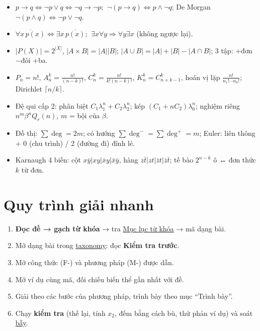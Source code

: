 \documentclass[
  10pt,
  twoside,openany]{book}
\providecommand{\tightlist}{%
  \setlength{\itemsep}{0pt}\setlength{\parskip}{0pt}}
\begin{document}
\begin{itemize}
\tightlist
\item
  \(p\to q\Leftrightarrow\neg p\vee q\Leftrightarrow\neg q\to\neg p\);
  \(\ \neg(p\to q)\Leftrightarrow p\wedge\neg q\); De Morgan
  \(\neg(p\wedge q)\Leftrightarrow\neg p\vee\neg q\).
\item
  \(\overline{\forall x\,p(x)}\Leftrightarrow\exists x\,\overline{p(x)}\);
  \(\ \exists x\forall y\Rightarrow\forall y\exists x\) (không ngược
  lại).
\item
  \(|P(X)|=2^{|X|}\), \(|A\times B|=|A||B|\);
  \(|A\cup B|=|A|+|B|-|A\cap B|\); 3 tập: \(+\)đơn \(-\)đôi \(+\)ba.
\item
  \(P_n=n!\), \(A_n^k=\frac{n!}{(n-k)!}\),
  \(C_n^k=\frac{n!}{k!(n-k)!}\), \(K_n^k=C_{n+k-1}^k\), hoán vị lặp
  \(\frac{n!}{n_1!\cdots n_k!}\); Dirichlet \(\lceil n/k\rceil\).
\item
  Đệ qui cấp 2: phân biệt \(C_1\lambda_1^n+C_2\lambda_2^n\); kép
  \((C_1+nC_2)\lambda_0^n\); nghiệm riêng \(n^m\beta^nQ_r(n)\), \(m\) =
  bội của \(\beta\).
\item
  Đồ thị: \(\sum\deg=2m\); có hướng \(\sum\deg^-=\sum\deg^+=m\); Euler:
  liên thông + 0 (chu trình) / 2 (đường đi) đỉnh lẻ.
\item
  Karnaugh 4 biến: cột \(x\bar y|xy|\bar xy|\bar x\bar y\), hàng
  \(z\bar t|zt|\bar zt|\bar z\bar t\); tế bào \(2^{n-k}\) ô ↔ đơn thức
  \(k\) từ đơn.
\end{itemize}

\hypertarget{quy-truxecnh-giux1ea3i-nhanh}{%
\section{Quy trình giải nhanh}\label{quy-truxecnh-giux1ea3i-nhanh}}

\begin{enumerate}
\def\labelenumi{\arabic{enumi}.}
\tightlist
\item
  \textbf{Đọc đề → gạch từ khóa} → tra
  \protect\hyperlink{keyword-index}{Mục lục từ khóa} → mã dạng bài.
\item
  Mở dạng bài trong \protect\hyperlink{taxonomy}{taxonomy}: đọc
  \textbf{Kiểm tra trước}.
\item
  Mở công thức (F-) và phương pháp (M-) được dẫn.
\item
  Mở ví dụ cùng mã, đối chiếu biến thể gần nhất với đề.
\item
  Giải theo các bước của phương pháp, trình bày theo mục ``Trình bày''.
\item
  Chạy \textbf{kiểm tra} (thế lại, tính \(x_2\), đếm bằng cách bù, thử
  phản ví dụ) và soát \protect\hyperlink{traps}{bẫy}.
\end{enumerate}
\end{document}

